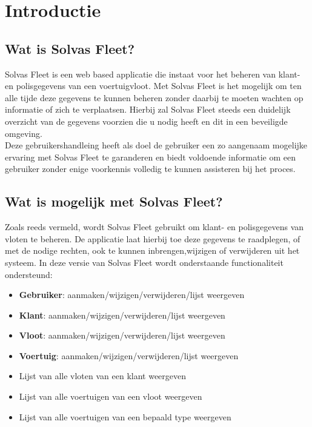 \documentclass[11pt,openany]{article}
\begin{document}
	
	\tableofcontents
	\newpage
	
\section{Introductie}

\subsection{Wat is Solvas Fleet?}
Solvas Fleet is een web based applicatie die instaat voor het beheren van klant- en polisgegevens van een voertuigvloot. Met Solvas Fleet is het mogelijk om ten alle tijde deze gegevens te kunnen beheren zonder daarbij te moeten wachten op informatie of zich te verplaatsen.  Hierbij zal Solvas Fleet steeds een duidelijk overzicht van de gegevens voorzien die u nodig heeft en dit in een beveiligde omgeving.\\

Deze gebruikershandleing heeft als doel de gebruiker een zo aangenaam mogelijke ervaring met Solvas Fleet te garanderen en biedt voldoende informatie om een gebruiker zonder enige voorkennis volledig te kunnen assisteren bij het proces.
\subsection{Wat is mogelijk met Solvas Fleet?}
Zoals reeds vermeld, wordt Solvas Fleet gebruikt om klant- en polisgegevens van vloten te beheren. De applicatie laat hierbij toe deze gegevens te raadplegen, of met de nodige rechten, ook te kunnen inbrengen,wijzigen of verwijderen uit het systeem. In deze versie van Solvas Fleet wordt onderstaande functionaliteit ondersteund:


\begin{itemize}[noitemsep]
	\item \textbf{Gebruiker}: aanmaken/wijzigen/verwijderen/lijst weergeven
	\item \textbf{Klant}: aanmaken/wijzigen/verwijderen/lijst weergeven
	\item \textbf{Vloot}: aanmaken/wijzigen/verwijderen/lijst weergeven
	\item \textbf{Voertuig}: aanmaken/wijzigen/verwijderen/lijst weergeven
	\item Lijst van alle vloten van een klant weergeven
	\item Lijst van alle voertuigen van een vloot weergeven
	\item Lijst van alle voertuigen van een bepaald type weergeven
\end{itemize}
\end{document}
